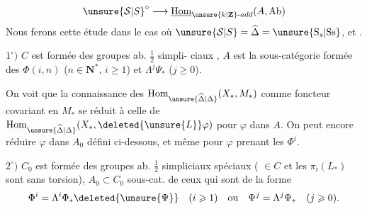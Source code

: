 \[
\unsure{\mathcal{S}|S}^\circ\longrightarrow\underline{\operatorname{Hom}}_{\unsure{k|\mathbf Z}\text{-}add}(A,\mathrm{Ab})
\]
Nous ferons cette étude dans le
cas où $\unsure{\mathcal{S}|S}=\widehat\Delta=\unsure{\mathrm{S}_s|\mathrm{Ss}}$, et 
\uline{}.

$1^\circ)$ $C$ est formée des groupes ab. $\frac12$ simpli-
ciaux , $A$ est la
sous-catégorie formée des
$\Phi(i,n)$ ($n\in\mathbf N^*$,  $i\geqslant1$) et $\Lambda^j\Psi_*$ ($j\geqslant0$).

On voit que  la connaissance des
$\operatorname{Hom}_{\unsure{\widehat\Delta|\Delta}}(X_*,M_*)$ comme foncteur
covariant en $M_*$ se réduit à
celle de $\operatorname{Hom}_{\unsure{\widehat\Delta|\Delta}}(X_*,\deleted{\unsure{L}}\varphi)$ pour
$\varphi$ dans $A$. On peut encore
réduire  $\varphi$ dans $A_0$ défini
ci-dessous, et même pour $\varphi$ prenant
les $\Phi^i$.

$2^\circ)$ $C_0$  est formée des groupes ab.
$\frac12$ simpliciaux  spéciaux
( $\in C$ et les $\pi_i(L_*)$ sont
sans torsion), $A_0\subset C_0$ sous-cat.
de ceux qui sont de la forme
\[
\Phi^i=\Lambda^i\Phi_*\deleted{\unsure{\Psi}}\quad(i\geqslant1)
\quad\text{ou}\quad\Psi^j=\Lambda^j\Psi_*\quad(j\geqslant0).
\]
